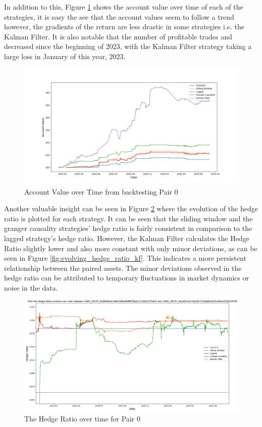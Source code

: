 In addition to this, Figure \ref{fig:ValueHistory} shows the account value over time of each of the strategies, it is easy the see that the account values seem to follow a trend however, the gradients of the return are less drastic in some strategies i.e. the Kalman Filter. It is also notable that the number of profitable trades and decreased since the beginning of 2023, with the Kalman Filter strategy taking a large loss in January of this year, 2023.

\begin{figure}[H]
    \centering
    \includegraphics[width=\linewidth]{evaluation/Images/ValueHistory.png}
    \caption{Account Value over Time from backtesting Pair 0}
    \label{fig:ValueHistory}
\end{figure}

Another valuable insight can be seen in Figure \ref{fig:HedgeRatioPerStrat} where the evolution of the hedge ratio is plotted for each strategy. It can be seen that the sliding window and the granger causality strategies' hedge ratio is fairly consistent in comparison to the lagged strategy's hedge ratio. However, the Kalman Filter calculates the Hedge Ratio slightly lower and also more constant with only minor deviations, as can be seen in Figure \ref{fig:evolving_hedge_ratio_kf}. This indicates a more persistent relationship between the paired assets. The minor deviations observed in the hedge ratio can be attributed to temporary fluctuations in market dynamics or noise in the data.

\begin{figure}[H]
    \centering
    \includegraphics[width=\linewidth]{evaluation/Images/HedgeRatioPerStrat.png}
    \caption{The Hedge Ratio over time for Pair 0}
    \label{fig:HedgeRatioPerStrat}
\end{figure}


